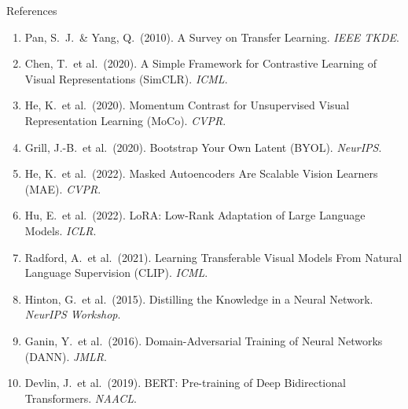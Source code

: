 \documentclass[11pt]{beamer}
\begin{document}
\begin{frame}{References}
    \small
    \begin{enumerate}
        \item Pan, S.~J.\ \& Yang, Q.\ (2010). A Survey on Transfer Learning. \textit{IEEE TKDE}.
        \item Chen, T.\ et al.\ (2020). A Simple Framework for Contrastive Learning of Visual Representations (SimCLR). \textit{ICML}.
        \item He, K.\ et al.\ (2020). Momentum Contrast for Unsupervised Visual Representation Learning (MoCo). \textit{CVPR}.
        \item Grill, J.-B.\ et al.\ (2020). Bootstrap Your Own Latent (BYOL). \textit{NeurIPS}.
        \item He, K.\ et al.\ (2022). Masked Autoencoders Are Scalable Vision Learners (MAE). \textit{CVPR}.
        \item Hu, E.\ et al.\ (2022). LoRA: Low-Rank Adaptation of Large Language Models. \textit{ICLR}.
        \item Radford, A.\ et al.\ (2021). Learning Transferable Visual Models From Natural Language Supervision (CLIP). \textit{ICML}.
        \item Hinton, G.\ et al.\ (2015). Distilling the Knowledge in a Neural Network. \textit{NeurIPS Workshop}.
        \item Ganin, Y.\ et al.\ (2016). Domain-Adversarial Training of Neural Networks (DANN). \textit{JMLR}.
        \item Devlin, J.\ et al.\ (2019). BERT: Pre-training of Deep Bidirectional Transformers. \textit{NAACL}.
    \end{enumerate}
\end{frame}
\end{document}
